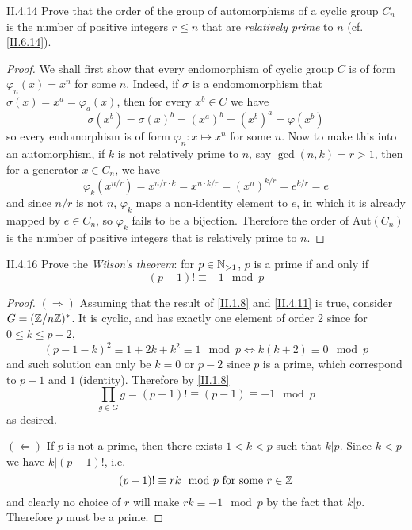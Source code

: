 \begin{problem}{II.4.14}
Prove that the order of the group of automorphisms of a cyclic group $C_n$ is the number of positive integers $r \leq n$ that are \emph{relatively prime} to $n$ (cf. \ref{II.6.14}).	
\end{problem}
\begin{proof}
We shall first show that every endomorphism of cyclic group $C$ is of form $\varphi_n(x) = x^n$ for some $n$. Indeed, if $\sigma$ is a endomomorphism that $\sigma(x) = x^a = \varphi_a(x)$, then for every $x^b \in C$ we have
\[
\sigma(x^b) = \sigma(x)^b = (x^a)^b = (x^b)^a = \varphi(x^b)	
\]
so every endomorphism is of form $\varphi_n : x \mapsto x^n$ for some $n$. Now to make this into an automorphism, if $k$ is not relatively prime to $n$, say $\gcd(n,k) = r > 1$, then for a generator $x \in C_n$, we have
\[
\varphi_k(x^{n/r}) = x^{n/r \cdot k} = x^{n \cdot k/r} = (x^{n})^{k/r} = e^{k/r} = e
\]
and since $n/r$ is not $n$, $\varphi_k$ maps a non-identity element to $e$, in which it is already mapped by $e \in C_n$, so $\varphi_k$ fails to be a bijection. Therefore the order of $\text{Aut}(C_n)$ is the number of positive integers that is relatively prime to $n$.
\end{proof}

\begin{problem}{II.4.16}
Prove the \textit{Wilson's theorem}: for $p \in \mathbb{N}_{>1}$, $p$ is a prime if and only if
\[
(p-1)! \equiv -1 \mod p
\]
\end{problem}
\begin{proof}
$(\Rightarrow)$ Assuming that the result of \ref{II.1.8} and \ref{II.4.11} is true, consider $G = (\mathbb{Z}/n\mathbb{Z})^*$. It is cyclic, and has exactly one element of order 2 since for $0 \leq k \leq p - 2$,
\[
(p-1-k)^2 \equiv 1 + 2k + k^2 \equiv 1 \mod p \iff k(k+2) \equiv 0 \mod p 
\]
and such solution can only be $k = 0 \text { or } p-2$ since $p$ is a prime, which correspond to $p-1$ and $1$ (identity). Therefore by \ref{II.1.8}
\[
\prod_{g \in G} g = (p-1)! \equiv (p-1) \equiv -1 \mod p
\]
as desired.

\noindent $(\Leftarrow)$ If $p$ is not a prime, then there exists $1 < k < p$ such that $k|p$. Since $k < p$ we have $k | (p-1)!$, i.e. 
\[
(p-1)! \equiv rk \mod p \text{ for some } r \in \mathbb{Z}
\]
and clearly no choice of $r$ will make $rk \equiv -1 \mod p$ by the fact that $k|p$. Therefore $p$ must be a prime.
\end{proof}

\section{}

